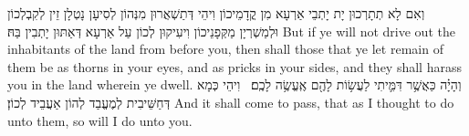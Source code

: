{וְאִם לָא תְתָרְכוּן יָת יָתְבֵי אַרְעָא מִן קֳדָמֵיכוֹן וִיהֵי דְּתַשְׁאֲרוּן מִנְּהוֹן לְסִיעָן נָטְלָן זֵין לְקִבְלְכוֹן וּלְמַשְׁרְיָן מַקְּפָנֵיכוֹן וִיעִיקוּן לְכוֹן עַל אַרְעָא דְּאַתּוּן יָתְבִין בַּהּ׃}
{But if ye will not drive out the inhabitants of the land from before you, then shall those that ye let remain of them be as thorns in your eyes, and as pricks in your sides, and they shall harass you in the land wherein ye dwell.}{}
{וְהָיָ֗ה כַּאֲשֶׁ֥ר דִּמִּ֛יתִי לַעֲשׂ֥וֹת לָהֶ֖ם אֶֽעֱשֶׂ֥ה לָכֶֽם׃ \petucha }
{וִיהֵי כְּמָא דְּחַשֵּׁיבִית לְמֶעֱבַד לְהוֹן אַעֲבֵיד לְכוֹן׃}
{And it shall come to pass, that as I thought to do unto them, so will I do unto you.}{}


